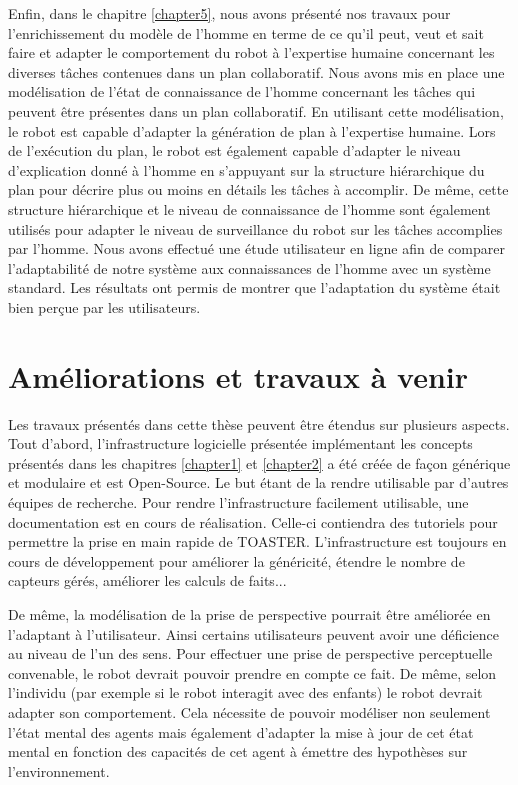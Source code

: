 \documentclass[a4paper,11pt,twoside]{StyleThese}
\begin{document}
Enfin, dans le chapitre \ref{chapter5}, nous avons présenté nos travaux pour l'enrichissement du modèle de l'homme en terme de ce qu'il peut, veut et sait faire et adapter le comportement du robot à l'expertise humaine concernant les diverses tâches contenues dans un plan collaboratif. Nous avons mis en place une modélisation de l'état de connaissance de l'homme concernant les tâches qui peuvent être présentes dans un plan collaboratif. En utilisant cette modélisation, le robot est capable d'adapter la génération de plan à l'expertise humaine. Lors de l'exécution du plan, le robot est également capable d'adapter le niveau d'explication donné à l'homme en s'appuyant sur la structure hiérarchique du plan pour décrire plus ou moins en détails les tâches à accomplir. De même, cette structure hiérarchique et le niveau de connaissance de l'homme sont également utilisés pour adapter le niveau de surveillance du robot sur les tâches accomplies par l'homme. Nous avons effectué une étude utilisateur en ligne afin de comparer l'adaptabilité de notre système aux connaissances de l'homme avec un système standard. Les résultats ont permis de montrer que l'adaptation du système était bien perçue par les utilisateurs.


\section{Améliorations et travaux à venir}
Les travaux présentés dans cette thèse peuvent être étendus sur plusieurs aspects.
Tout d'abord, l'infrastructure logicielle présentée implémentant les concepts présentés dans les chapitres \ref{chapter1} et \ref{chapter2} a été créée de façon générique et modulaire et est Open-Source. Le but étant de la rendre utilisable par d'autres équipes de recherche. Pour rendre l'infrastructure facilement utilisable, une documentation est en cours de réalisation. Celle-ci contiendra des tutoriels pour permettre la prise en main rapide de TOASTER.
L'infrastructure est toujours en cours de développement pour améliorer la généricité, étendre le nombre de capteurs gérés, améliorer les calculs de faits...

De même, la modélisation de la prise de perspective pourrait être améliorée en l'adaptant à l'utilisateur. Ainsi certains utilisateurs peuvent avoir une déficience au niveau de l'un des sens. Pour effectuer une prise de perspective perceptuelle convenable, le robot devrait pouvoir prendre en compte ce fait.
De même, selon l'individu (par exemple si le robot interagit avec des enfants) le robot devrait adapter son comportement. Cela nécessite de pouvoir modéliser non seulement l'état mental des agents mais également d'adapter la mise à jour de cet état mental en fonction des capacités de cet agent à émettre des hypothèses sur l'environnement.
\end{document}
